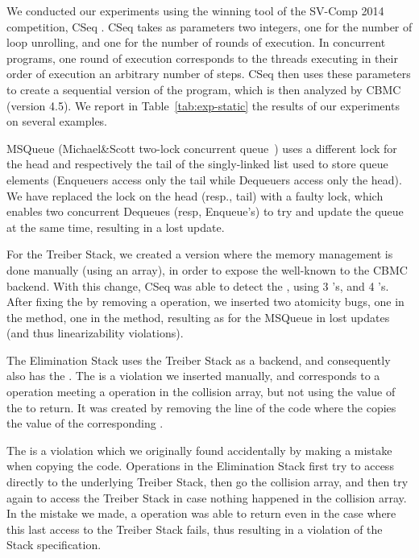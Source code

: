 We conducted our experiments using the winning tool of the SV-Comp 2014 
competition, CSeq \citep{cseq}. CSeq takes as parameters two integers, 
one for the number of loop unrolling, and one for the number of rounds of 
execution. In concurrent programs, one round of execution corresponds to the
threads executing in their order of execution an arbitrary number of steps.
CSeq then uses these parameters to create a sequential version of the program,
which is then analyzed by CBMC (version 4.5). We report in 
Table~\ref{tab:exp-static} the results of our experiments on several examples.

MSQueue (Michael\&Scott two-lock concurrent queue~\cite{DBLP:conf/podc/MichaelS96})
uses a different lock for the head and respectively the tail of the singly-linked list used to store
queue elements (Enqueuers access only the tail while Dequeuers access only the head). 
We have replaced the lock on the head (resp., tail) with a faulty lock, 
which enables two concurrent Dequeues (resp, Enqueue's) 
to try and update the queue at the same time, resulting in a lost update.

For the Treiber Stack, we created a version where the memory management is done
manually (using an array), in order to expose the well-known \ababug{} to the 
CBMC backend. With this change, CSeq was able to detect the \ababug{}, using 3 
\Pushm's, and 4 \Popm's. After fixing the \ababug{} by removing a \free{} 
operation, we inserted two atomicity bugs, one in the \Pushm{} method, one in 
the \Popm{} method, resulting as for the MSQueue in lost updates (and thus 
linearizability violations).

The Elimination Stack \citep{elimination stack} uses the Treiber Stack as a 
backend, and consequently also has the \ababug{}. The \emptybug{} is a 
violation we inserted manually, and corresponds to a \Popm{} operation meeting 
a \Pushm{} operation in the collision array, but not using the value of the 
\Pushm{} to return. It was created by removing the line of the code where the 
\Popm{} copies the value of the corresponding \Pushm{}. 

The \bracebug{} is a violation which we originally found accidentally by making 
a mistake when copying the code. Operations in the Elimination Stack first try 
to access directly to the underlying Treiber Stack, then go the collision array, 
and then try again to access the Treiber Stack in case nothing happened in the 
collision array. In the mistake we made, a \Popm{} operation was able to return 
even in the case where this last access to the Treiber Stack fails, thus 
resulting in a violation of the Stack specification.

